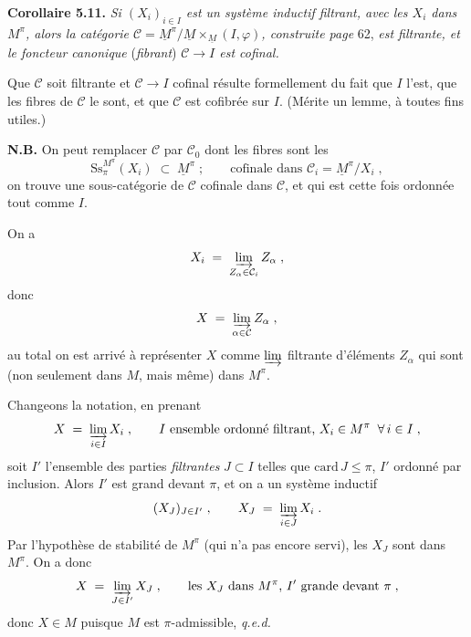 \documentclass[11pt]{article}
\newcommand{\printedpage}[1]{\marginpar{\raggedright\footnotesize p.~#1}}
\newcommand{\msp}[1]{\marginpar{\raggedright\footnotesize [#1]}}
\newcommand{\Ss}{\mathrm{Ss}}
\newcommand{\Ci}{\mathcal{C}}
\begin{document}
\textbf{Corollaire 5.11.} \textit{Si $(X_i)_{i \in I}$ est un système inductif filtrant, avec les $X_i$ dans $M^\pi$, alors la catégorie $\Ci = \underline{M}^\pi/\underline{M} \times_{\underline{M}} (I,\varphi)$, construite page} 62, \textit{est filtrante, et le foncteur canonique} (\textit{fibrant}) \textit{$\Ci \longrightarrow I$ est cofinal.}

Que $\Ci$ soit filtrante et $\Ci \longrightarrow I$ cofinal résulte formellement du fait que $I$ l'est, que les fibres de $\Ci$ le sont, et que $\Ci$ est cofibrée sur $I$. (Mérite un lemme, à toutes fins utiles.)

\textbf{N.B.} On peut remplacer $\Ci$ par $\Ci_0$ dont les fibres sont les
\[
\Ss_\pi^{M^\pi}(X_i) \;\subset\; \underline{M}^\pi \;; \qquad \text{cofinale dans } \Ci_i = \underline{M}^\pi/X_i \;,
\]
\msp{page 65}
on trouve une sous-catégorie de $\Ci$ cofinale dans $\Ci$, et qui est cette fois ordonnée tout comme $I$.

\printedpage{38}
On a
\[
X_i \;=\; \varinjlim_{Z_\alpha \in \Ci_i} Z_\alpha \;,
\]
donc
\[
X \;=\; \varinjlim_{\alpha \in \Ci} Z_\alpha \;,
\]
au total on est arrivé à représenter $X$ comme $\varinjlim$ filtrante d'éléments $Z_\alpha$ qui sont (non seulement dans $M$, mais même) dans $M^\pi$.

Changeons la notation, en prenant
\[
X \;=\; \varinjlim_{i \in I} X_i \;, \qquad I \text{ ensemble ordonné filtrant, } X_i \in M^\pi \;\; \forall\, i \in I \;,
\]
soit $I'$ l'ensemble des parties \textit{filtrantes} $J \subset I$ telles que $\mathrm{card}\, J \leq \pi$, $I'$ ordonné par inclusion. Alors $I'$ est grand devant $\pi$, et on a un système inductif
\[
(X_J)_{J \in I'} \;, \qquad X_J \;=\; \varinjlim_{i \in J} X_i \;.
\]
Par l'hypothèse de stabilité de $M^\pi$ (qui n'a pas encore servi), les $X_J$ sont dans $M^\pi$. On a donc
\[
X \;=\; \varinjlim_{J \in I'} X_J \;, \qquad \text{les } X_J \text{ dans } M^\pi\text{, } I' \text{ grande devant } \pi \;,
\]
donc $X \in M$ puisque $M$ est $\pi$-admissible, \quad \textit{q.e.d.}

\msp{page 66}
\end{document}
